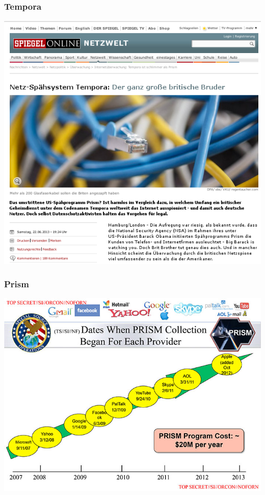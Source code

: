 \documentclass[12pt]{beamer}
\begin{document}
\subsection{}


\begin{frame}
    \frametitle{Tempora}
    \includegraphics[height=0.7\textheight]{img/spiegel-tempora.png}
\end{frame}

\begin{frame}
    \frametitle{Prism}
    \includegraphics[height=0.7\textheight]{img/prism.jpg}
\end{frame}
\end{document}
